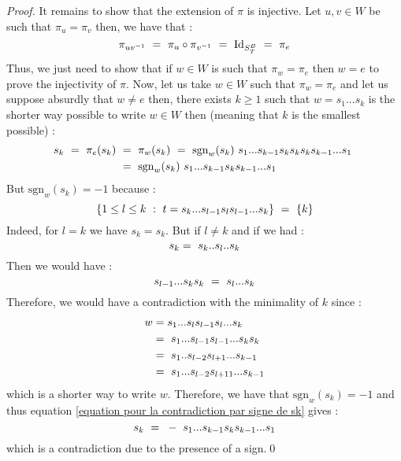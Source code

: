 \begin{proof}
	It remains to show that the extension of $\pi$ is injective. Let $u,v\in W$ be such that $\pi_u=\pi_v$ then, we have that :
	\begin{equation}
	\pi_{uv^{-1}}\text{ }=\text{ } \pi_u\circ \pi_{v^{-1}}\text{ }=\text{ } \mbox{Id}_{S_T^B}\text{ }=\text{ }  \pi_e
	\end{equation}
	Thus, we just need to show that if $w\in W$ is such that $\pi_w=\pi_e$ then $w=e$ to prove the injectivity of $\pi$. Now, let us take $w\in W$ such that $\pi_w=\pi_e$ and let us suppose absurdly that $w\not=e$ then, there exists $k\geq 1$ such that $w=s_1...s_k$ is the shorter way possible to write $w\in W$ then (meaning that $k$ is the smallest possible) :
	\begin{equation}\label{equation pour la contradiction par signe de sk}
	\begin{split}
		s_k\text{ }=\text{ }\pi_e(s_k)\text{ }&=\text{ } \pi_w(s_k)\text{ } =\text{ }\mbox{sgn}_w(s_k)\text{ } s_1...s_{k-1}s_ks_ks_ks_{k-1}...s_1\text{ }\\
		&=\text{ }\mbox{sgn}_w(s_k)\text{ } s_1...s_{k-1}s_ks_{k-1}...s_1
	\end{split}
	\end{equation}
	But $\mbox{sgn}_w(s_k)=-1$ because :
	\begin{equation}
	\{1\leq l\leq k\text{ } :\text{ } t=s_k...s_{l-1}s_l s_{l-1}...s_k\}\text{ }=\text{ } \{k\}
	\end{equation}
	Indeed, for $l=k$ we have $s_k=s_k$. But if $l\not=k$ and if we had :
	\begin{equation}
	s_k=\text{ } s_k..s_l..s_k
	\end{equation}
	Then we would have :
	\begin{equation}
	s_{l-1}...s_ks_k\text{ }=\text{ } s_l...s_k
	\end{equation}
	Therefore, we would have a contradiction with the minimality of $k$ since :
	\begin{equation}
	\begin{split}
	w&=s_1...s_ls_{l-1}s_l...s_k\text{ }\\
	&=\text{ } s_1...s_{l-1}s_{l-1}...s_ks_k\text{ }\\
	&=\text{ } s_1..s_{l-2}s_{l+1}...s_{k-1}\text{ }\\
	&=\text{ } s_1...s_{l-2}s_{l+11}...s_{k-1}
	\end{split}
	\end{equation}
	which is a shorter way to write $w$. Therefore, we have that $\mbox{sgn}_w(s_k)=-1$ and thus equation \ref{equation pour la contradiction par signe de sk} gives :
	\begin{equation}
			s_k\text{ }=\text{ } -\text{ }  s_1...s_{k-1}s_ks_{k-1}...s_1
	\end{equation}
	which is a contradiction due to the presence of a sign.\qed
	\end{proof}


